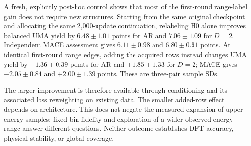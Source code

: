 

A fresh, explicitly post-hoc control shows that most of the first-round
range-label gain does not require new structures. Starting from the same
original checkpoint and allocating the same 2,000-update continuation,
relabeling H0 alone improves balanced UMA yield by $6.48\pm1.01$ points for
AR and $7.06\pm1.09$ for $D=2$. Independent MACE assessment gives
$6.11\pm0.98$ and $6.80\pm0.91$ points. At identical first-round range edges,
adding the acquired rows instead changes UMA yield by $-1.36\pm0.39$ points
for AR and $+1.85\pm1.33$ for $D=2$; MACE gives $-2.05\pm0.84$ and
$+2.00\pm1.39$ points. These are three-pair sample SDs.

The larger improvement is therefore available through conditioning and its
associated loss reweighting on existing data. The smaller added-row effect
depends on architecture. This does not negate the measured expansion of
upper-energy samples: fixed-bin fidelity and exploration of a wider observed
energy range answer different questions. Neither outcome establishes DFT
accuracy, physical stability, or global coverage.
